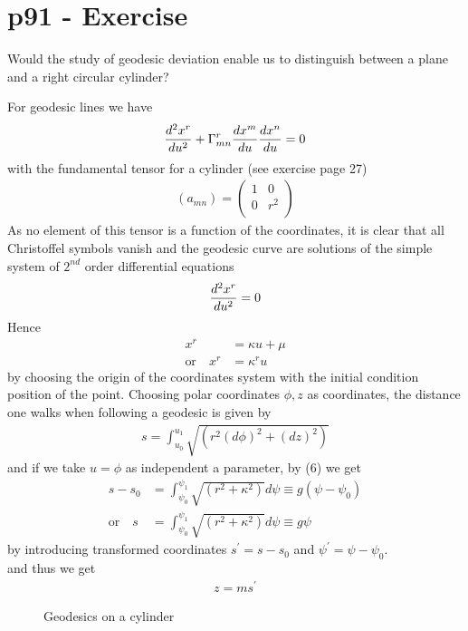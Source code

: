 \section{p91 - Exercise}
\begin{tcolorbox}
Would the study of geodesic deviation enable us to distinguish between a plane and a right circular cylinder?
\end{tcolorbox}
For geodesic lines we have
\begin{align}
\dv[2]{x^r}{u} + \Gamma^r_{mn}\dv{x^m}{u}\dv{x^n}{u} = 0\\
\end{align}
with the fundamental tensor for a cylinder (see exercise page 27)
\begin{align} 
(a_{mn}) = \begin{pmatrix}
 1& 0 \\
0 & r^2 \\
\end{pmatrix}
\end{align}
As no element of this tensor is a function of the coordinates, it is clear that all Christoffel symbols vanish and the geodesic curve are solutions of the simple system of $2^{nd}$ order differential equations
\begin{align}
\dv[2]{x^r}{u}  = 0
\end{align}
Hence
\begin{align}
x^r  &= \kappa u + \mu\\
\text{or}\quad x^r &= \kappa^r u
\end{align}
by choosing the origin of the coordinates system with the initial condition position of the point.
Choosing polar coordinates $\phi, z$ as coordinates, the distance one walks when following a geodesic is given by
\begin{align}
 s= \int_{u_0}^{u_1}\sqrt{(r^2(d\phi)^2 + (dz)^2)}
\end{align}
and if we take $u=\phi$ as independent a parameter, by (6) we get 
\begin{align}
 s-s_0 &= \int_{\psi_0}^{\psi_1}\sqrt{(r^2 + \kappa^2)}d\psi \equiv g(\psi - \psi_0)\\
 \text{or}\quad s&= \int_{\psi_0}^{\psi_1}\sqrt{(r^2 + \kappa^2)}d\psi \equiv g\psi
\end{align}
by introducing transformed coordinates $s^{'}= s-s_0$ and $\psi^{'} =\psi - \psi_0$.\\
and thus we get 
\begin{align}
 z = m s^{'}
\end{align}
\begin{figure}[H]
\begin{minipage}[t]{.4\textwidth}
\vspace{0pt}

\end{minipage}\hfill
\caption{Geodesics on a cylinder}
\end{figure}
